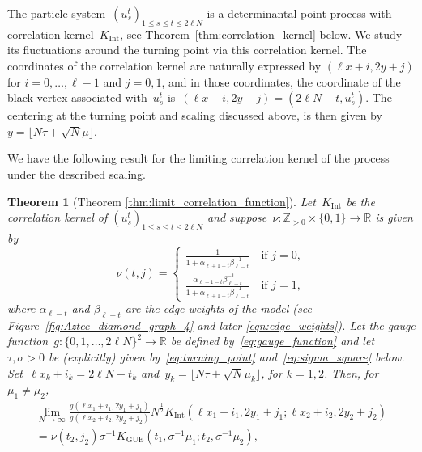 \documentclass[11pt]{article}
\theoremstyle{plain}
\newtheorem{theorem}{Theorem}[section]
\theoremstyle{definition}
\numberwithin{equation}{section}
\newcommand{\ZZ}{\mathbb{Z}}
\begin{document}
The particle system~$(u_{s}^t)_{1\leq s\leq t\leq 2\ell N}$ is a determinantal point process with correlation kernel~$K_{\operatorname{Int}}$,
%
see Theorem~\ref{thm:correlation_kernel} below. We study its fluctuations around the turning point via this correlation kernel. The coordinates of the correlation kernel are naturally expressed by $(\ell x+i,2y+j)$ for $i=0,\dots,\ell-1$ and $j=0,1$, and in those coordinates, the coordinate of the black vertex associated with~$u_s^t$ is~$(\ell x+i,2y+j)=(2\ell N-t,u_s^t)$. The centering at the turning point and scaling discussed above, is then given by ~$y=\lfloor N\tau +\sqrt{N}\mu\rfloor$.


We have the following result for the limiting correlation kernel of the process under the described scaling.

%
\begin{theorem}[Theorem \ref{thm:limit_correlation_function}]\label{thm:0}
Let~$K_{\operatorname{Int}}$ be the correlation kernel of $(u_{s}^t)_{1\leq s\leq t\leq 2\ell N}$ and suppose~$\nu:\ZZ_{>0}\times \{0,1\} \rightarrow \mathbb{R}$ is given by
\begin{equation}
 \nu(t,j)=
\begin{cases}
 \frac{1}{1+\alpha_{\ell+1-t}\beta_{\ell-t}^{-1}} \quad \text{if } j=0, \\
 \frac{\alpha_{\ell+1-t}\beta_{\ell-t}^{-1}}{1+\alpha_{\ell+1-t}\beta_{\ell-t}^{-1}} \quad \text{if } j=1,
\end{cases} 
\end{equation}
where $\alpha_{\ell-t}$ and $\beta_{\ell-t}$ are the edge weights of the model (see Figure~\ref{fig:Aztec_diamond_graph_4} and later \eqref{eqn:edge_weights}).
Let the gauge function~$g:\{0,1,\ldots, 2\ell N\}^2\rightarrow \mathbb{R}$ be defined by~\eqref{eq:gauge_function} and let~$\tau, \sigma>0$ be (explicitly) given by~\eqref{eq:turning_point} and~\eqref{eq:sigma_square} below.
%
%
Set~$\ell x_k+i_k=2\ell N-t_k$ and~$y_k=\lfloor N\tau +\sqrt{N}\mu_k\rfloor$, for $k=1,2$. Then, for $\mu_1\neq \mu_2$,
\begin{multline}
\lim_{N\to \infty}\frac{g(\ell x_1+i_1,2y_1+j_1)}{g(\ell x_2+i_2,2y_2+j_2)}N^{\frac{1}{2}}K_{\operatorname{Int}}\left(\ell x_1+i_1,2y_1+j_1;\ell x_2+i_2,2y_2+j_2\right) \\
=\nu(t_2,j_2)\sigma^{-1}K_{\operatorname{GUE}}(t_1,\sigma^{-1}\mu_1;t_2,\sigma^{-1}\mu_2), 

\end{multline}
\end{theorem}
\end{document}
